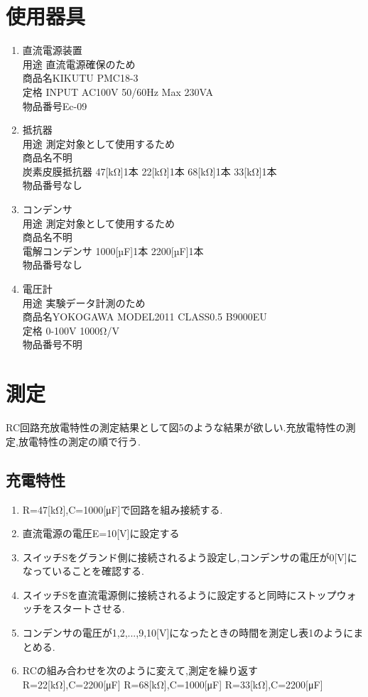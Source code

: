 \documentclass[titlepage]{jarticle}
\begin{document}
\section{使用器具}
\begin{enumerate}
    \item 直流電源装置\\用途 直流電源確保のため\\商品名KIKUTU PMC18-3\\定格 INPUT AC100V 50/60Hz Max 230VA\\物品番号Ec-09
    \item 抵抗器\\用途 測定対象として使用するため\\商品名不明\\炭素皮膜抵抗器 47[kΩ]1本 22[kΩ]1本 68[kΩ]1本 33[kΩ]1本\\物品番号なし
    \item コンデンサ\\用途 測定対象として使用するため\\商品名不明\\電解コンデンサ 1000[µF]1本 2200[µF]1本\\物品番号なし
    \item 電圧計\\用途 実験データ計測のため\\商品名YOKOGAWA MODEL2011 CLASS0.5 B9000EU\\定格 0-100V 1000Ω/V\\物品番号不明
\end{enumerate}

\section{測定}
RC回路充放電特性の測定結果として図5のような結果が欲しい.充放電特性の測定,放電特性の測定の順で行う.
\subsection{充電特性}
\begin{enumerate}
    \item R=47[kΩ],C=1000[μF]で回路を組み接続する.
    \item 直流電源の電圧E=10[V]に設定する
    \item スイッチSをグランド側に接続されるよう設定し,コンデンサの電圧が0[V]になっていることを確認する.
    \item スイッチSを直流電源側に接続されるように設定すると同時にストップウォッチをスタートさせる.
    \item コンデンサの電圧が1,2,...,9,10[V]になったときの時間を測定し表1のようにまとめる.
    \item RCの組み合わせを次のように変えて,測定を繰り返す\\R=22[kΩ],C=2200[μF] R=68[kΩ],C=1000[μF] R=33[kΩ],C=2200[μF]
\end{enumerate}
\end{document}
